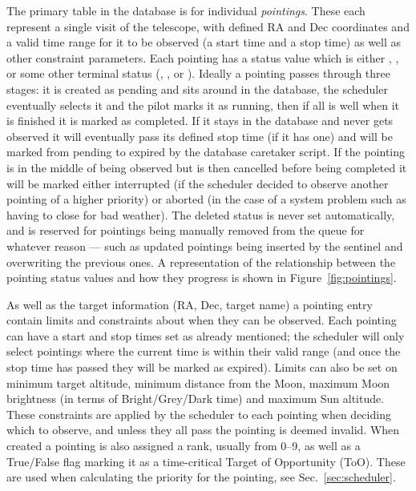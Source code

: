 \begin{colsection}
\begin{colsection}
The primary table in the database is for individual \textit{pointings}. These each represent a single visit of the telescope, with defined RA and Dec coordinates and a valid time range for it to be observed (a start time and a stop time) as well as other constraint parameters. Each pointing has a status value which is either , ,  or some other terminal status (, ,  or ). Ideally a pointing passes through three stages: it is created as pending and sits around in the database, the scheduler eventually selects it and the pilot marks it as running, then if all is well when it is finished it is marked as completed. If it stays in the database and never gets observed it will eventually pass its defined stop time (if it has one) and will be marked from pending to expired by the database caretaker script. If the pointing is in the middle of being observed but is then cancelled before being completed it will be marked either interrupted (if the scheduler decided to observe another pointing of a higher priority) or aborted (in the case of a system problem such as having to close for bad weather). The deleted status is never set automatically, and is reserved for pointings being manually removed from the queue for whatever reason --- such as updated pointings being inserted by the sentinel and overwriting the previous ones. A representation of the relationship between the pointing status values and how they progress is shown in Figure~\ref{fig:pointings}.

As well as the target information (RA, Dec, target name) a pointing entry contain limits and constraints about when they can be observed. Each pointing can have a start and stop times set as already mentioned; the scheduler will only select pointings where the current time is within their valid range (and once the stop time has passed they will be marked as expired). Limits can also be set on minimum target altitude, minimum distance from the Moon, maximum Moon brightness (in terms of Bright/Grey/Dark time) and maximum Sun altitude. These constraints are applied by the scheduler to each pointing when deciding which to observe, and unless they all pass the pointing is deemed invalid. When created a pointing is also assigned a rank, usually from 0--9, as well as a True/False flag marking it as a time-critical Target of Opportunity (ToO). These are used when calculating the priority for the pointing, see Sec.~\ref{sec:scheduler}.


\end{colsection}
\end{colsection}
